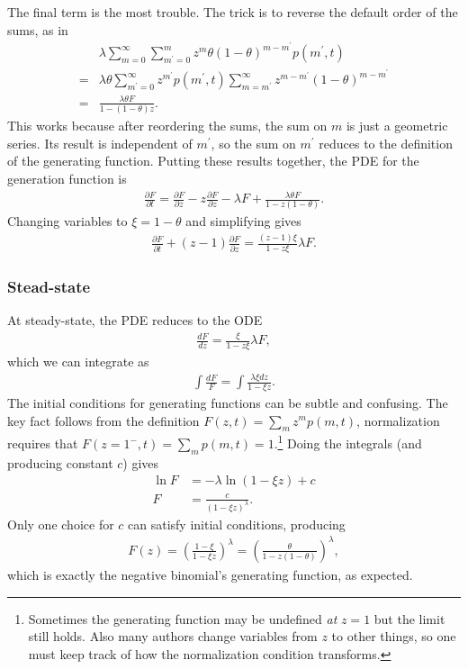 \documentclass[12pt]{article}%
\newcommand{\deriv}[2][{}]{\frac{d #1}{d #2}}
\newcommand{\pderiv}[2][{}]{\frac{\partial #1}{\partial #2}}
\begin{document}
The final term is the most trouble. The trick is to reverse
the default order of the sums, as in
\begin{align}
&\lambda \sum_{m=0}^\infty \sum_{m^\prime=0}^m
        z^m \theta(1 - \theta)^{m-m^\prime} p(m^\prime,t)
\\=
&\lambda\theta \sum_{m^\prime=0}^\infty z^{m^\prime} p(m^\prime,t)
        \sum_{m=m^\prime}^\infty
        z^{m-m^\prime} (1 - \theta)^{m-m^\prime}
\\=
&\frac{\lambda\theta F}{1 - (1 - \theta)z}.
\end{align}
This works because after reordering the sums, the sum on $m$ is just
a geometric series. Its result is independent of $m^\prime$, so the sum on
$m^\prime$ reduces to the definition of the generating function.
Putting these results together, the PDE for the generation function is
\begin{align}
\pderiv[F]{t} = \pderiv[F]{z} - z\pderiv[F]{z} - \lambda F
        + \frac{\lambda\theta F}{1-z(1-\theta)}.
\end{align}
Changing variables to $\xi=1-\theta$ and simplifying gives
\begin{align}
\pderiv[F]{t} + (z - 1) \pderiv[F]{z} = \frac{(z-1)\xi}{1-z\xi}\lambda F.
\label{eq:1state_unreg_015}
\end{align}
\subsubsection{Stead-state}
At steady-state, the PDE reduces to the ODE
\begin{align}
\deriv[F]{z} = \frac{\xi}{1-z\xi}\lambda F,
\end{align}
which we can integrate as
\begin{align}
\int \frac{dF}{F} = \int \frac{\lambda\xi dz}{1-\xi z}.
\end{align}
The initial conditions for generating functions can be subtle and confusing.
The key fact follows from the definition
$F(z,t) = \sum_m z^m p(m,t)$,
normalization requires that
$F(z=1^-,t) = \sum_m p(m,t) = 1$.\footnote{
Sometimes the generating function may be undefined \textit{at} $z=1$ but the
limit still holds. Also many authors change variables from $z$ to other
things, so one must keep track of how the normalization condition transforms.
}
Doing the integrals (and producing constant $c$) gives
\begin{align}
\ln F &= -\lambda \ln(1-\xi z) + c
\\
F &= \frac{c}{(1-\xi z)^\lambda}.
\end{align}
Only one choice for $c$ can satisfy initial conditions, producing
\begin{align}
F(z) = \left(\frac{1-\xi}{1-\xi z}\right)^\lambda
        = \left(\frac{\theta}{1 - z(1-\theta)}\right)^\lambda,
\end{align}
which is exactly the negative binomial's generating function, as expected.
\end{document}

